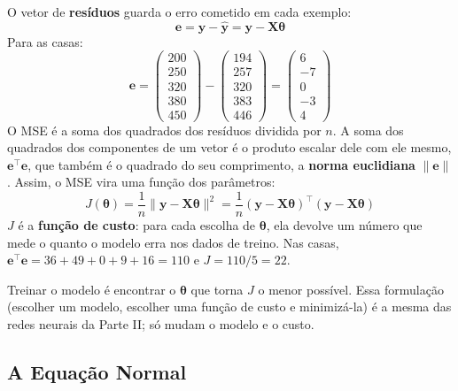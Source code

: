 \documentclass[a4paper,12pt,openany]{book}
\begin{document}
O vetor de \textbf{resíduos} guarda o erro cometido em cada exemplo:
\[
\mathbf{e} = \mathbf{y} - \hat{\mathbf{y}} = \mathbf{y} - \mathbf{X}\boldsymbol{\theta}
\]
Para as casas:
\[
\mathbf{e} = \begin{pmatrix} 200 \\ 250 \\ 320 \\ 380 \\ 450 \end{pmatrix} - \begin{pmatrix} 194 \\ 257 \\ 320 \\ 383 \\ 446 \end{pmatrix} = \begin{pmatrix} 6 \\ -7 \\ 0 \\ -3 \\ 4 \end{pmatrix}
\]
O MSE é a soma dos quadrados dos resíduos dividida por \(n\). A soma dos quadrados dos componentes de um vetor é o produto escalar dele com ele mesmo, \(\mathbf{e}^\top \mathbf{e}\), que também é o quadrado do seu comprimento, a \textbf{norma euclidiana} \(\|\mathbf{e}\|\). Assim, o MSE vira uma função dos parâmetros:
\begin{equation}\label{eq:custo_mse}
J(\boldsymbol{\theta}) = \frac{1}{n} \|\mathbf{y} - \mathbf{X}\boldsymbol{\theta}\|^2 = \frac{1}{n} (\mathbf{y} - \mathbf{X}\boldsymbol{\theta})^\top (\mathbf{y} - \mathbf{X}\boldsymbol{\theta})
\end{equation}
\(J\) é a \textbf{função de custo}: para cada escolha de \(\boldsymbol{\theta}\), ela devolve um número que mede o quanto o modelo erra nos dados de treino. Nas casas, \(\mathbf{e}^\top\mathbf{e} = 36 + 49 + 0 + 9 + 16 = 110\) e \(J = 110/5 = 22\).

Treinar o modelo é encontrar o \(\boldsymbol{\theta}\) que torna \(J\) o menor possível. Essa formulação (escolher um modelo, escolher uma função de custo e minimizá-la) é a mesma das redes neurais da Parte II; só mudam o modelo e o custo.

\subsection{A Equação Normal}
\end{document}
